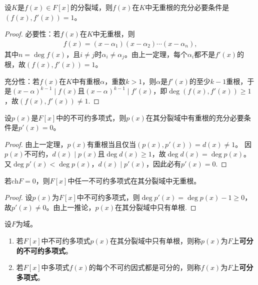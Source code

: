 \documentclass[../../main.tex]{subfiles}%
\begin{document}
\begin{theorem}
设$K$是$f(x)\in F[x]$的分裂域，则$f(x)$在$K$中无重根的充分必要条件是$(f(x),f'(x))=1$。
\end{theorem}

\begin{proof}

必要性：若$f(x)$在$K$中无重根，则
\begin{align*}
f(x)=(x-\alpha_1)(x-\alpha_2)\cdots(x-\alpha_n),
\end{align*}
其中$n=\deg f(x)$，且$i\neq j$时$\alpha_i\neq\alpha_j$。由上一定理，每个$\alpha_i$都不是$f'(x)$的根，故$(f(x),f'(x))=1$。

充分性：若$f(x)$在$K$中有重根$\alpha$，重数$k>1$，则$\alpha$是$f'(x)$的至少$k-1$重根，于是$(x-\alpha)^{k-1}\mid f(x)$且$(x-\alpha)^{k-1}\mid f'(x)$，即$\deg(f(x),f'(x))\geqslant1$，故$(f(x),f'(x))\neq1$.

\end{proof}

\begin{corollary}
设$p(x)$是$F[x]$中的不可约多项式，则$p(x)$在其分裂域中有重根的充分必要条件是$p'(x)=0$。
\end{corollary}

\begin{proof}

由上一定理，$p(x)$有重根当且仅当$(p(x),p'(x))=d(x)\neq1$。
因$p(x)$不可约，$d(x)\mid p(x)$且$\deg d(x)\geqslant1$，故$\deg d(x)=\deg p(x)$。
又$\deg p'(x)<\deg p(x)$，$d(x)\mid p'(x)$，因此必有$p'(x)=0$.

\end{proof}

\begin{corollary}
若$\mathrm{ch}F=0$，则$F[x]$中任一不可约多项式在其分裂域中无重根。
\end{corollary}

\begin{proof}

设$p(x)$为$F[x]$中不可约多项式，则$\deg p'(x)=\deg p(x)-1\geqslant0$，故$p'(x)\neq0$。由上一推论，$p(x)$在其分裂域中只有单根.

\end{proof}

\begin{definition}
设$F$为域。
\begin{enumerate}[(1)]
\item 若$F[x]$中不可约多项式$p(x)$在其分裂域中只有单根，则称$p(x)$为$F$上\textbf{可分的不可约多项式}。
\item 若$F[x]$中多项式$f(x)$的每个不可约因式都是可分的，则称$f(x)$为$F$上\textbf{可分多项式}。
\end{enumerate}
\end{definition}
\end{document}
